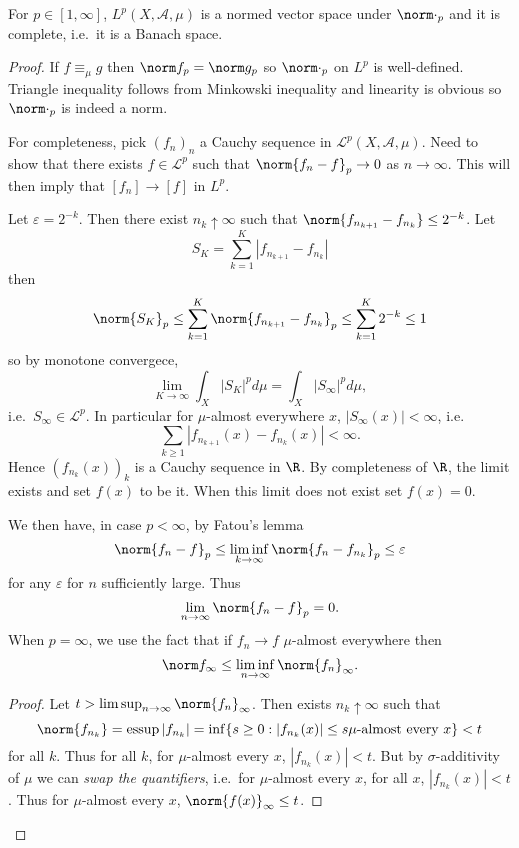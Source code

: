 \documentclass[a4paper]{article}
\DeclareMathOperator{\essup}{essup} %
\begin{document}
\begin{proposition}
  For \(p \in [1, \infty]\), \(L^p(X, \mathcal A, \mu)\) is a normed vector space under \(\norm \cdot_p\) and it is complete, i.e.\ it is a Banach space.
\end{proposition}

\begin{proof}
  If \(f \equiv_\mu g\) then \(\norm f_p = \norm g_p\) so \(\norm \cdot_p\) on \(L^p\) is well-defined. Triangle inequality follows from Minkowski inequality and linearity is obvious so \(\norm \cdot_p\) is indeed a norm.

  For completeness, pick \((f_n)_n\) a Cauchy sequence in \(\mathcal L^p(X, \mathcal A, \mu)\). Need to show that there exists \(f \in \mathcal L^p\) such that \(\norm{f_n - f}_p \to 0\) as \(n \to \infty\). This will then imply that \([f_n] \to [f]\) in \(L^p\).

  Let \(\varepsilon = 2^{-k}\). Then there exist \(n_k \uparrow \infty\) such that \(\norm{f_{n_{k + 1}} - f_{n_k}} \leq 2^{-k}\). Let
  \[
    S_K = \sum_{k = 1}^K |f_{n_{k + 1}} - f_{n_k}|
  \]
  then
  \[
    \norm{S_K}_p
    \leq \sum_{k = 1}^K \norm{f_{n_{k + 1}} - f_{n_k}}_p
    \leq \sum_{k = 1}^K 2^{-k}
    \leq 1
  \]
  so by monotone convergece,
  \[
    \lim_{K \to \infty} \int_X |S_K|^p d\mu = \int_X |S_\infty|^p d\mu,
  \]
  i.e.\ \(S_\infty \in \mathcal L^p\). In particular for \(\mu\)-almost everywhere \(x\), \(|S_\infty(x)| < \infty\), i.e.
  \[
    \sum_{k \geq 1} |f_{n_{k + 1}}(x) - f_{n_k}(x)| < \infty.
  \]
  Hence \((f_{n_k}(x))_k\) is a Cauchy sequence in \(\R\). By completeness of \(\R\), the limit exists and set \(f(x)\) to be it. When this limit does not exist set \(f(x) = 0\).

  We then have, in case \(p < \infty\), by Fatou's lemma
  \[
    \norm{f_n - f}_p \leq \liminf_{k \to \infty} \norm{f_n - f_{n_k}}_p \leq \varepsilon
  \]
  for any \(\varepsilon\) for \(n\) sufficiently large. Thus
  \[
    \lim_{n \to \infty} \norm{f_n - f}_p = 0.
  \]
  When \(p = \infty\), we use the fact that if \(f_n \to f\) \(\mu\)-almost everywhere then
  \[
    \norm f_\infty \leq \liminf_{n \to \infty} \norm{f_n}_\infty.
  \]

  \begin{proof}
    Let \(t > \limsup_{n \to \infty} \norm{f_n}_\infty\). Then exists \(n_k \uparrow \infty\) such that
    \[
      \norm{f_{n_k}} = \essup |f_{n_k}| = \inf \{s \geq 0: |f_{n_k}(x)| \leq s \mu\text{-almost every } x\} < t
    \]
    for all \(k\). Thus for all \(k\), for \(\mu\)-almost every \(x\), \(|f_{n_k}(x)| < t\). But by \(\sigma\)-additivity of \(\mu\) we can \emph{swap the quantifiers}, i.e.\ for \(\mu\)-almost every \(x\), for all \(x\), \(|f_{n_k}(x)| < t\). Thus for \(\mu\)-almost every \(x\), \(\norm{f(x)}_\infty \leq t\).
  \end{proof}
\end{proof}
\end{document}

